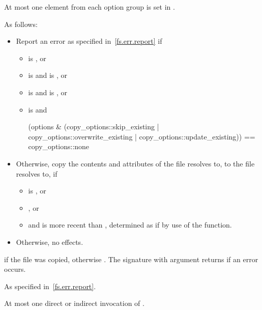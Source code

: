 \begin{itemdescr}
\pnum
\expects
At most one element from each
option group is set
in .

\pnum
\effects
As follows:
\begin{itemize}
\item
Report an error as specified in~\ref{fs.err.report} if
\begin{itemize}
\item {} is , or
\item {} is  and  is , or
\item {} is  and  is , or
\item {} is  and
\begin{codeblock}
(options & (copy_options::skip_existing |
            copy_options::overwrite_existing |
            copy_options::update_existing)) == copy_options::none
\end{codeblock}
\end{itemize}

\item
Otherwise, copy the contents and attributes of the file 
    resolves to, to the file  resolves to, if
\begin{itemize}
\item {} is , or
\item {}, or
\item {} and 
      is more recent than , determined as if by use of the  function.
\end{itemize}

\item
Otherwise, no effects.
\end{itemize}

\pnum
\returns
{} if the  file
  was copied, otherwise . The signature with argument  returns
   if an error occurs.

\pnum
\throws
As specified in~\ref{fs.err.report}.

\pnum
\complexity
At most one direct or indirect invocation of .
\end{itemdescr}

